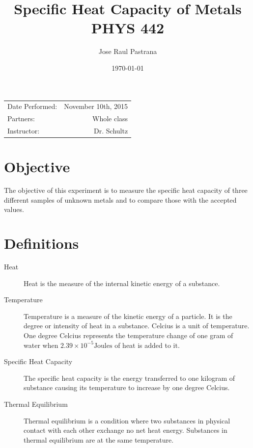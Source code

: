 \documentclass{article}
\title{Specific Heat Capacity of Metals \\ PHYS 442} %
\author{Jose Raul Pastrana } %
\date{\today} %
\begin{document}
\maketitle %

\begin{center}
\begin{tabular}{l r}
Date Performed: & November 10th, 2015 \\ %
Partners: & Whole class \\ %
Instructor: & Dr. Schultz %
\end{tabular}
\end{center}



\section{Objective}

The objective of this experiment is to measure the specific heat capacity of three different samples of unknown metals and to compare those with the accepted values.  \\ 

\section{Definitions}
\label{definitions}
\begin{description}
\item[Heat]
Heat is the measure of the internal kinetic energy of a substance.
\item[Temperature]
Temperature is a measure of the kinetic energy of a particle.  It is the degree or intensity of heat in a substance.  Celcius is a unit of temperature.  One degree Celcius represents the temperature change of one gram of water when $2.39\times10^{-5}\text{Joules}$ of heat is added to it.

\item[Specific Heat Capacity]
The specific heat capacity is the energy transferred to one kilogram of substance causing its temperature to increase by one degree Celcius. \cite{Homer:2014}

\item[Thermal Equilibrium]
Thermal equilibrium is a condition where two substances in physical contact with each other exchange no net heat energy.  Substances in thermal equilibrium are at the same temperature.
\end{description}
\end{document}
